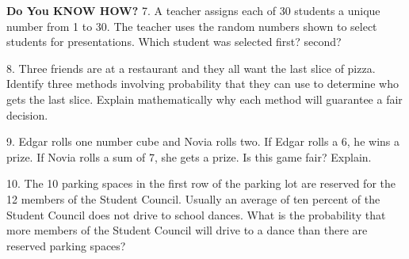 \documentclass{article}
\newenvironment{concept-summary}{}{}    %
\newcommand{\answer}[1]{}               %
\newcommand{\placeholder}[2]{}          %
\newcommand{\te}[1]{}                   %
\begin{document}
\begin{concept-summary}
\te{Printed answer equates expected value with win frequency; unequal payoff sizes can make a fair game have unequal win and loss probabilities, as the adjacent Common Error notes.}
\textbf{Do You KNOW HOW?}
7. A teacher assigns each of 30 students a unique number from 1 to 30. The teacher uses the random numbers shown to select students for presentations. Which student was selected first? second?
\placeholder{diagram}{Calculator screen shows randInt(1,30), result 9; randInt(1,30), result 9; randInt(1,30), result 4.}
\answer{student 9, then student 4}
8. Three friends are at a restaurant and they all want the last slice of pizza. Identify three methods involving probability that they can use to determine who gets the last slice. Explain mathematically why each method will guarantee a fair decision.
\answer{(1) Write each friend's name on a slip of paper, and draw one slip at random from a paper bag to determine who gets the last slice. Each slip has a 1 in 3 chance of being chosen. (2) Assign the numbers 1 and 2 to one friend, 3 and 4 to a second friend, and 5 and 6 to the third friend. Roll a number cube, and give the slice to the friend whose number lands on top. Each person has a 2 in 6 chance of being chosen. (3) Assign each friend a number from 0 to 2. Use a calculator to generate a random number from 1 to 9. Divide the number by 3, and give the slice to the friend whose number matches the remainder. Each person has a 3 in 9 chance of being chosen.}
9. Edgar rolls one number cube and Novia rolls two. If Edgar rolls a 6, he wins a prize. If Novia rolls a sum of 7, she gets a prize. Is this game fair? Explain.
\answer{Yes; they each have a (\frac16) chance of winning, and the expected value is 0.}
10. The 10 parking spaces in the first row of the parking lot are reserved for the 12 members of the Student Council. Usually an average of ten percent of the Student Council does not drive to school dances. What is the probability that more members of the Student Council will drive to a dance than there are reserved parking spaces?
\answer{0.659 or 65.9\%}
\end{concept-summary}
\end{document}
